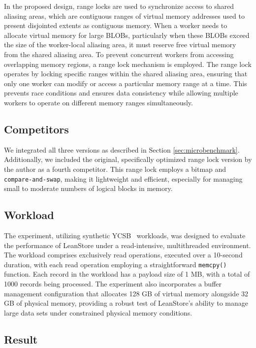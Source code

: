 In the proposed design, range locks are used to synchronize access to shared aliasing areas, which are contiguous ranges of virtual memory addresses used to present disjointed extents as contiguous memory. When a worker needs to allocate virtual memory for large BLOBs, particularly when these BLOBs exceed the size of the worker-local aliasing area, it must reserve free virtual memory from the shared aliasing area. To prevent concurrent workers from accessing overlapping memory regions, a range lock mechanism is employed. The range lock operates by locking specific ranges within the shared aliasing area, ensuring that only one worker can modify or access a particular memory range at a time. This prevents race conditions and ensures data consistency while allowing multiple workers to operate on different memory ranges simultaneously. 

\subsection{Competitors}

We integrated all three versions as described in Section \ref{sec:microbenchmark}. Additionally, we included the original, specifically optimized range lock version by the author as a fourth competitor. This range lock employs a bitmap and \texttt{compare-and-swap}, making it lightweight and efficient, especially for managing small to moderate numbers of logical blocks in memory.

\subsection{Workload}

The experiment, utilizing synthetic YCSB~\parencite{cooper2010benchmarking} workloads, was designed to evaluate the performance of LeanStore under a read-intensive, multithreaded environment. The workload comprises exclusively read operations, executed over a 10-second duration, with each read operation employing a straightforward \texttt{memcpy()} function. Each record in the workload has a payload size of 1 MB, with a total of 1000 records being processed. The experiment also incorporates a buffer management configuration that allocates 128 GB of virtual memory alongside 32 GB of physical memory, providing a robust test of LeanStore's ability to manage large data sets under constrained physical memory conditions.

\subsection{Result}

